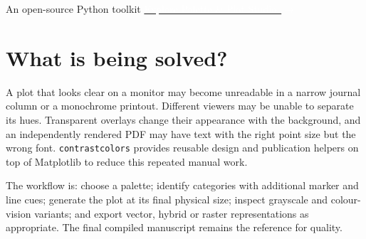 \documentclass[10pt,twocolumn,a4paper]{article}
\begin{document}
\begin{titlepage}
\noindent
{\sffamily\footnotesize\textcolor{CoverMuted}{
 An open-source Python toolkit \quad
 \href{https://heri-espino.github.io/Colors/studio.html}
 {\textcolor{white}{Explore Palette \& Plot Studio\ \(\rightarrow\)}}}
}
\end{titlepage}
\nopagecolor
\color{black}
\twocolumn
\setcounter{page}{1}

\begin{abstract}
This two-column article is a reproducible technical presentation of
\texttt{contrastcolors}, a Python library for scientific palette design,
publication-sized figures and accessible visual identifiers. We show
how hue, chroma and relative luminance are chosen; how categorical
graphics can be inspected in grayscale and simulated colour-vision
conditions; how transparent observations interact with backgrounds;
and how a local LaTeX installation supplies document dimensions
and fonts. We compare true-vector PDF/PGF output with intentional
hybrid vector--raster export and construct both a full-page and a
landscape accessibility dashboard. The interactive Palette \& Plot
Studio offers a browser-based path to many of the same choices.
Every result is generated by the associated reproducible script.
\end{abstract}

\section{What is being solved?}
A plot that looks clear on a monitor may become unreadable in a
narrow journal column or a monochrome printout. Different viewers
may be unable to separate its hues. Transparent overlays change
their appearance with the background, and an independently rendered
PDF may have text with the right point size but the wrong font.
\texttt{contrastcolors} provides reusable design and publication
helpers on top of Matplotlib to reduce this repeated manual work.

The workflow is: choose a palette; identify categories with
additional marker and line cues; generate the plot at its final
physical size; inspect grayscale and colour-vision variants;
and export vector, hybrid or raster representations as appropriate.
The final compiled manuscript remains the reference for quality.
\end{document}
